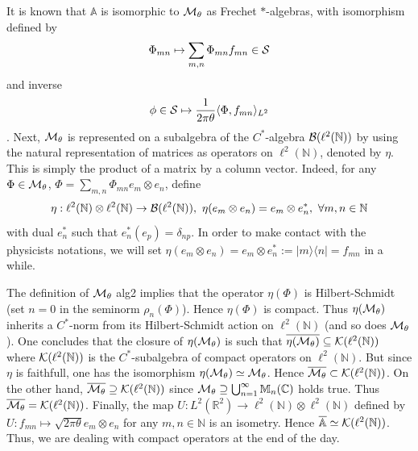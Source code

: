 \documentclass[10pt]{book}
\theoremstyle{break}
\begin{document}
It is known that ${\mathbb{A}}$ is isomorphic to ${\cal{M}}_\theta$ as Frechet $*$-algebras, with isomorphism defined by $$\Phi_{mn}\mapsto \sum_{m,n}\Phi_{mn}f_{mn}\in{\cal{S}}$$ and inverse $$\phi\in{\cal{S}}\mapsto\frac{1}{2\pi\theta}\langle \Phi,f_{mn}\rangle_{L^2}$$. Next, ${\cal{M}}_\theta$ is represented on a subalgebra of the $C^*$-algebra  ${\cal{B}}(\ell^2(\mathbb{N}))$ by using the natural representation of matrices as operators on $\ell^2(\mathbb{N})$, denoted by $\eta$. This is simply the product of a matrix by a column vector. Indeed, for any $\Phi\in{\cal{M}}_\theta$, $\Phi=\sum_{m,n}\Phi_{mn}e_m\otimes e_n$, define
\begin{equation}
\eta:\ell^2(\mathbb{N})\otimes\ell^2(\mathbb{N})\to{\cal{B}}(\ell^2(\mathbb{N})),\ \eta(e_m\otimes e_n)=e_m\otimes e^*_n,\ \forall m,n\in\mathbb{N}
\end{equation}
with dual $e^*_n$ such that $e^*_n(e_p)=\delta_{np}$. In order to make contact with the physicists notations, we will set $\eta(e_m\otimes e_n)=e_m\otimes e^*_n:=|m\rangle\langle n|=f_{mn}$ in a while. \par
The definition of ${\cal{M}}_\theta$ {alg2} implies that the operator $\eta(\Phi)$ is Hilbert-Schmidt (set $n=0$ in the seminorm $\rho_n(\Phi)$). Hence $\eta(\Phi)$ is compact. Thus $\eta({\cal{M}}_\theta)$ inherits a $C^*$-norm from its Hilbert-Schmidt action on $\ell^2(\mathbb{N})$ (and so does ${\cal{M}}_\theta$). One concludes that the closure of $\eta({\cal{M}}_\theta)$ is such that $\overline{\eta({\cal{M}}_\theta)}\subseteq{\cal{K}}(\ell^2(\mathbb{N}))$ where ${\cal{K}}(\ell^2(\mathbb{N}))$ is the $C^*$-subalgebra of compact operators on $\ell^2(\mathbb{N})$. But since $\eta$ is faithfull, one has the isomorphism $\eta({\cal{M}}_\theta)\simeq{\cal{M}}_\theta$. Hence $\overline{{\cal{M}}_\theta}\subset{\cal{K}}(\ell^2(\mathbb{N}))$. On the other hand, $\overline{{\cal{M}}_\theta}\supseteq{\cal{K}}(\ell^2(\mathbb{N}))$ since ${\cal{M}}_\theta\supseteq\bigcup_{n=1}^\infty{\mathbb{M}}_n(\mathbb{C})$ holds true. Thus $\overline{{\cal{M}}_\theta}={\cal{K}}(\ell^2(\mathbb{N}))$. Finally, the map $U:L^2(
\mathbb{R}^2)\to\ell^2(\mathbb{N})\otimes\ell^2(\mathbb{N})$ defined by $U:f_{mn}\mapsto {\sqrt{2\pi\theta}}e_m\otimes e_n$ for any $m,n\in\mathbb{N}$ is an isometry. Hence $\overline{{\mathbb{A}}}\simeq{\cal{K}}(\ell^2(\mathbb{N}))$. Thus, we are dealing with compact operators at the end of the day.\par
\end{document}
